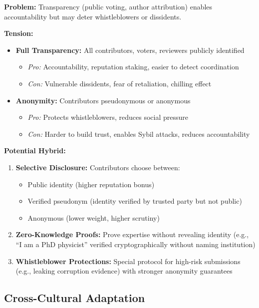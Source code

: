 \documentclass[11pt,a4paper]{article}
\theoremstyle{definition}
\theoremstyle{remark}
\begin{document}
\textbf{Problem:} Transparency (public voting, author attribution) enables accountability but may deter whistleblowers or dissidents.

\textbf{Tension:}
\begin{itemize}
    \item \textbf{Full Transparency:} All contributors, voters, reviewers publicly identified
    \begin{itemize}
        \item \textit{Pro:} Accountability, reputation staking, easier to detect coordination
        \item \textit{Con:} Vulnerable dissidents, fear of retaliation, chilling effect
    \end{itemize}
    \item \textbf{Anonymity:} Contributors pseudonymous or anonymous
    \begin{itemize}
        \item \textit{Pro:} Protects whistleblowers, reduces social pressure
        \item \textit{Con:} Harder to build trust, enables Sybil attacks, reduces accountability
    \end{itemize}
\end{itemize}

\textbf{Potential Hybrid:}
\begin{enumerate}
    \item \textbf{Selective Disclosure:} Contributors choose between:
    \begin{itemize}
        \item Public identity (higher reputation bonus)
        \item Verified pseudonym (identity verified by trusted party but not public)
        \item Anonymous (lower weight, higher scrutiny)
    \end{itemize}
    \item \textbf{Zero-Knowledge Proofs:} Prove expertise without revealing identity (e.g., ``I am a PhD physicist'' verified cryptographically without naming institution)
    \item \textbf{Whistleblower Protections:} Special protocol for high-risk submissions (e.g., leaking corruption evidence) with stronger anonymity guarantees
\end{enumerate}

\subsection{Cross-Cultural Adaptation}
\end{document}
